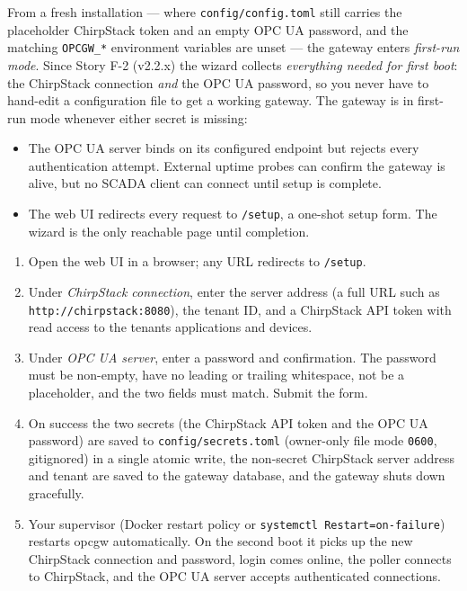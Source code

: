 From a fresh installation --- where \texttt{config/config.toml} still carries the placeholder ChirpStack token and an empty OPC UA password, and the matching \texttt{OPCGW\_*} environment variables are unset --- the gateway enters \emph{first-run mode}. Since Story F-2 (v2.2.x) the wizard collects \emph{everything needed for first boot}: the ChirpStack connection \emph{and} the OPC UA password, so you never have to hand-edit a configuration file to get a working gateway. The gateway is in first-run mode whenever either secret is missing:

\begin{itemize}
\item
  The OPC UA server binds on its configured endpoint but rejects every authentication attempt. External uptime probes can confirm the gateway is alive, but no SCADA client can connect until setup is complete.
\item
  The web UI redirects every request to \texttt{/setup}, a one-shot setup form. The wizard is the only reachable page until completion.
\end{itemize}

\begin{enumerate}
\item
  Open the web UI in a browser; any URL redirects to \texttt{/setup}.
\item
  Under \emph{ChirpStack connection}, enter the server address (a full URL such as \texttt{http://chirpstack:8080}), the tenant ID, and a ChirpStack API token with read access to the tenant\textquotesingle s applications and devices.
\item
  Under \emph{OPC UA server}, enter a password and confirmation. The password must be non-empty, have no leading or trailing whitespace, not be a placeholder, and the two fields must match. Submit the form.
\item
  On success the two secrets (the ChirpStack API token and the OPC UA password) are saved to \texttt{config/secrets.toml} (owner-only file mode \texttt{0600}, gitignored) in a single atomic write, the non-secret ChirpStack server address and tenant are saved to the gateway database, and the gateway shuts down gracefully.
\item
  Your supervisor (Docker restart policy or \texttt{systemctl\ Restart=on-failure}) restarts opcgw automatically. On the second boot it picks up the new ChirpStack connection and password, login comes online, the poller connects to ChirpStack, and the OPC UA server accepts authenticated connections.
\end{enumerate}

